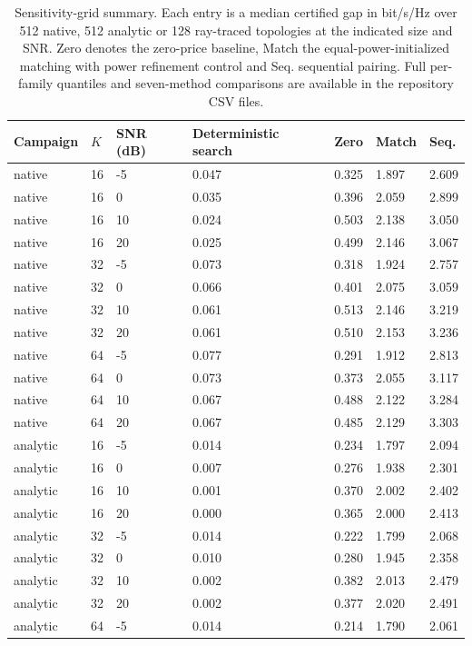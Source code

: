 \documentclass[10pt,letterpaper]{article}
\begin{document}
\begin{table}[htbp]\centering\small
\setlength{\tabcolsep}{3pt}
\caption{Sensitivity-grid summary. Each entry is a median certified gap in bit/s/Hz over 512 native, 512 analytic or 128 ray-traced topologies at the indicated size and SNR. Zero denotes the zero-price baseline, Match the equal-power-initialized matching with power refinement control and Seq. sequential pairing. Full per-family quantiles and seven-method comparisons are available in the repository CSV files.}\label{supp:table5}
\begin{tabular}{lllllll}\toprule
Campaign & $K$ & SNR (dB) & Deterministic search & Zero & Match & Seq.\\\midrule
native & 16 & -5 & 0.047 & 0.325 & 1.897 & 2.609\\
native & 16 & 0 & 0.035 & 0.396 & 2.059 & 2.899\\
native & 16 & 10 & 0.024 & 0.503 & 2.138 & 3.050\\
native & 16 & 20 & 0.025 & 0.499 & 2.146 & 3.067\\
native & 32 & -5 & 0.073 & 0.318 & 1.924 & 2.757\\
native & 32 & 0 & 0.066 & 0.401 & 2.075 & 3.059\\
native & 32 & 10 & 0.061 & 0.513 & 2.146 & 3.219\\
native & 32 & 20 & 0.061 & 0.510 & 2.153 & 3.236\\
native & 64 & -5 & 0.077 & 0.291 & 1.912 & 2.813\\
native & 64 & 0 & 0.073 & 0.373 & 2.055 & 3.117\\
native & 64 & 10 & 0.067 & 0.488 & 2.122 & 3.284\\
native & 64 & 20 & 0.067 & 0.485 & 2.129 & 3.303\\
analytic & 16 & -5 & 0.014 & 0.234 & 1.797 & 2.094\\
analytic & 16 & 0 & 0.007 & 0.276 & 1.938 & 2.301\\
analytic & 16 & 10 & 0.001 & 0.370 & 2.002 & 2.402\\
analytic & 16 & 20 & 0.000 & 0.365 & 2.000 & 2.413\\
analytic & 32 & -5 & 0.014 & 0.222 & 1.799 & 2.068\\
analytic & 32 & 0 & 0.010 & 0.280 & 1.945 & 2.358\\
analytic & 32 & 10 & 0.002 & 0.382 & 2.013 & 2.479\\
analytic & 32 & 20 & 0.002 & 0.377 & 2.020 & 2.491\\
analytic & 64 & -5 & 0.014 & 0.214 & 1.790 & 2.061\\

\end{tabular}
\end{table}
\end{document}
